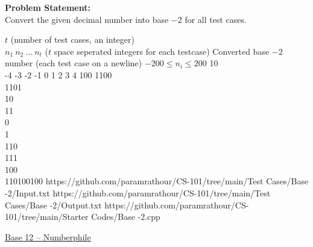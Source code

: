 \documentclass[../../Problems]{subfiles}
\begin{document}
\textbf{Problem Statement:}\\
Convert the given decimal number into base $-2$ for all test cases.
\begin{testcasesMore}
	{$t$ \hfill(number of test cases, an integer)\\
	$n_1\ n_2\ \ldots\ n_t$ \hfill($t$ space seperated integers for each testcase)}
	{Converted base $-2$ number \hfill(each test case on a newline)}
	{$-200 \leq n_i \leq 200$}
	{10\\-4 -3 -2 -1 0 1 2 3 4 100}
	{1100\\1101\\10\\11\\0\\1\\110\\111\\100\\110100100}
	{https://github.com/paramrathour/CS-101/tree/main/Test Cases/Base -2/Input.txt}
	{https://github.com/paramrathour/CS-101/tree/main/Test Cases/Base -2/Output.txt}
	{https://github.com/paramrathour/CS-101/tree/main/Starter Codes/Base -2.cpp}
\end{testcasesMore}
\begin{funvideo}
\href{https://youtu.be/U6xJfP7-HCc}{Base 12 -- Numberphile}
\end{funvideo}
\end{document}
